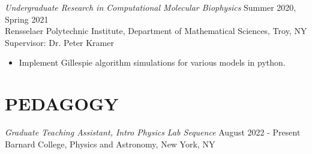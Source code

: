 \documentclass[margin]{rpires}
\begin{document}
\begin{resume}
    {\sl Undergraduate Research in Computational Molecular Biophysics} \hfill Summer 2020, Spring 2021 \\
    Rensselaer Polytechnic Institute, 
    Department of Mathematical Sciences, Troy, NY\\
    Supervisor: Dr. Peter Kramer
    \begin{itemize}  \itemsep -2pt %
    \item Implement Gillespie algorithm simulations for various models in python. 
    \end{itemize}



\section{PEDAGOGY}
    
    {\sl Graduate Teaching Assistant, Intro Physics Lab Sequence} \hfill August 2022 - Present \\
    Barnard College, Physics and Astronomy, New York, NY


\end{resume}
\end{document}

